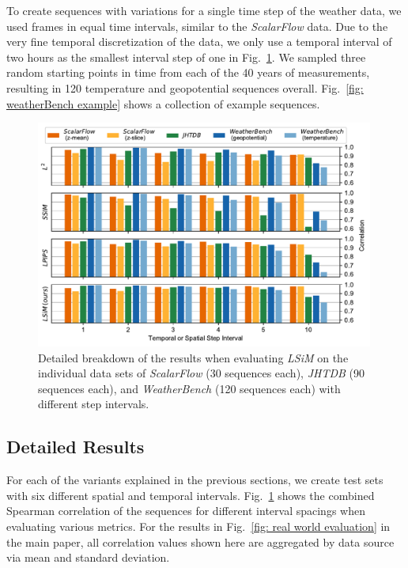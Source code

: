 To create sequences with variations for a single time step of the weather data, we used frames in equal time intervals, similar to the \textit{ScalarFlow} data. Due to the very fine temporal discretization of the data, we only use a temporal interval of two hours as the smallest interval step of one in Fig.~\ref{fig: real world evaluation detailed}. We sampled three random starting points in time from each of the 40 years of measurements, resulting in 120 temperature and geopotential sequences overall. Fig.~\ref{fig: weatherBench example} shows a collection of example sequences.


\begin{figure}[ht]
    \centering
    \includegraphics[width=0.99\textwidth]{Images/RealWorldEvaluationDetailed}
    \vspace{-0.5cm}
    \caption{Detailed breakdown of the results when evaluating \textit{LSiM} on the individual data sets of \textit{ScalarFlow} (30 sequences each), \textit{JHTDB} (90 sequences each), and \textit{WeatherBench} (120 sequences each) with different step intervals.}
    \label{fig: real world evaluation detailed}
\end{figure}


\subsection{Detailed Results}
For each of the variants explained in the previous sections, we create test sets with six different spatial and temporal intervals. 
Fig.~\ref{fig: real world evaluation detailed} shows the combined Spearman correlation of the sequences for different interval spacings when evaluating various metrics. For the results in Fig.~\ref{fig: real world evaluation} in the main paper, all correlation values shown here are aggregated by data source via mean and standard deviation.

